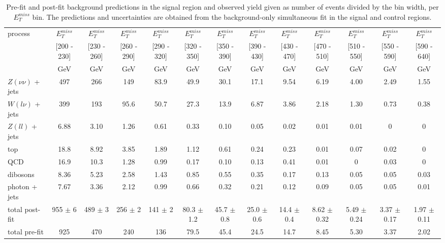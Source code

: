 \begin{landscape}

\begin{table}[ht]
  \centering
  \setlength{\tabcolsep}{3pt}
\caption{Pre-fit and post-fit background predictions in the signal region and observed yield given as number of events divided by the bin width, per $E_T^{miss}$ bin. The predictions and uncertainties are obtained from the background-only simultaneous fit in the signal and control regions.}
\label{tab:monojet_yields_1}
\scriptsize
\begin{subtable}{}
\renewcommand{\arraystretch}{1.2}
\begin{tabular}{| l | c | c | c | c | c | c | c | c | c | c | c | c |}
\hline
\multirow{3}{*}{process} &  $E_T^{miss}$ &  $E_T^{miss}$ &  $E_T^{miss}$ &  $E_T^{miss}$ &  $E_T^{miss}$ &  $E_T^{miss}$ &  $E_T^{miss}$ &  $E_T^{miss}$ &  $E_T^{miss}$ &  $E_T^{miss}$ &  $E_T^{miss}$ &  $E_T^{miss}$  \\
 & [200 - 230] & [230 - 260] & [260 - 290] & [290 - 320] & [320 - 350] & [350 - 390] & [390 - 430] & [430 - 470] & [470 - 510] & [510 - 550] & [550 - 590] & [590 - 640]  \\
 & GeV & GeV & GeV & GeV & GeV & GeV & GeV & GeV & GeV & GeV & GeV & GeV \\
\hline
  $Z(\nu\nu)$ + jets & 497 & 266 & 149 & 83.9 & 49.9 & 30.1 & 17.1 & 9.54 & 6.19 & 4.00 & 2.49 & 1.55\\
  $W(l\nu)$ + jets & 399 & 193 & 95.6 & 50.7 & 27.3 & 13.9 & 6.87 & 3.86 & 2.18 & 1.30 & 0.73 & 0.38\\
  $Z(ll)$ + jets & 6.88 & 3.10 & 1.26 & 0.61 & 0.33 & 0.10 & 0.05 & 0.02 & 0.01 & 0.01 & 0 & 0 \\
  top & 18.8 & 8.92 & 3.85 & 1.89 & 1.12 & 0.61 & 0.24 & 0.23 & 0.01 & 0.07 & 0.02 & 0\\
  QCD & 16.9 & 10.3 & 1.28 & 0.99 & 0.17 & 0.10 & 0.13 & 0.41 & 0.01 & 0 & 0.03 & 0\\
  dibosons & 8.36 & 5.23 & 2.58 & 1.43 & 0.85 & 0.55 & 0.35 & 0.17 & 0.13 & 0.05 & 0.05 & 0.03\\
  photon + jets & 7.67 & 3.36 & 2.12 & 0.99 & 0.66 & 0.32 & 0.21 & 0.12 & 0.09 & 0.05 & 0.05 & 0.01 \\
\hline
  total post-fit & 955 $\pm$ 6 & 489 $\pm$ 3 & 256 $\pm$ 2 & 141 $\pm$ 2 & 80.3 $\pm$ 1.2 & 45.7 $\pm$ 0.8 & 25.0 $\pm$ 0.6 & 14.4 $\pm$ 0.4 & 8.62 $\pm$ 0.32 & 5.49 $\pm$ 0.24 & 3.37 $\pm$ 0.17 & 1.97 $\pm$ 0.11 \\
\hline
  total pre-fit & 925 & 470 & 240 & 136 & 79.5 & 45.4 & 24.5 & 14.7 & 8.45 & 5.30 & 3.37 & 2.02\\

\end{tabular}
\end{subtable}
\end{table}
\end{landscape}

